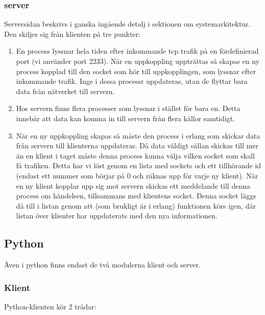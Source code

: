 \documentclass{scrartcl}
\begin{document}
\subsubsection{server}
Serversidan beskrivs i ganska ingående detalj i sektionen om systemarkitektur. Den skiljer sig från klienten på tre punkter:
\begin{enumerate}
\item En process lyssnar hela tiden efter inkommande tcp trafik på en fördefinierad port (vi använder port 2233). När en uppkoppling uppträttas så skapas en ny process kopplad till den socket som hör till uppkopplingen, som lyssnar efter inkommande trafik. Inge i dessa processr uppdateras, utan de flyttar bara data från nätverket till servern.
\smallskip
\item Hos servern finns flera processer som lyssnar i stället för bara en. Detta innebär att data kan komma in till servern från flera källor samtidigt.
\smallskip
\item När en ny uppkoppling skapas så måste den process i erlang som skickar data från servern till klienterna uppdateras. Då data väldigt sällan skickas till mer än en klient i taget måste denna process kunna välja vilken socket som skall få trafiken. \linebreak
Detta har vi löst genom en lista med sockets och ett tillhörande id (endast ett nummer som börjar på 0 och räknas upp för varje ny klient). När en ny klient kopplar upp sig mot servern skickas ett meddelande till denna process om händelsen, tillsammans med klientens socket. Denna socket läggs då till i listan genom att (som brukligt är i erlang) funktionen körs igen, där listan över klienter har uppdaterats med den nya informationen.
\end{enumerate}

\smallskip
\subsection{Python}
Även i python finns endast de två modulerna klient och server.

\subsubsection{Klient}
Python-klienten kör 2 trådar: 
\end{document}
